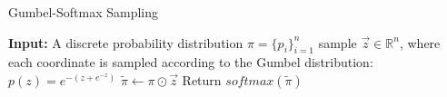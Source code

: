 \begin{algorithm}[H]
\caption{Gumbel-Softmax Sampling}
\begin{algorithmic}[1]
	\State \textbf{Input:} A discrete probability distribution $\pi = \{p_i\}_{i=1}^{n}$
    \State sample $\vec{z}\in \mathbb{R}^n$, where each coordinate is sampled according to the Gumbel distribution: $p(z) = e^{-(z+e^{-z})}$
    \State $\widetilde{\pi} \gets \pi \odot \vec{z}$ 
    \State Return $softmax(\widetilde{\pi})$
\end{algorithmic}
\end{algorithm}